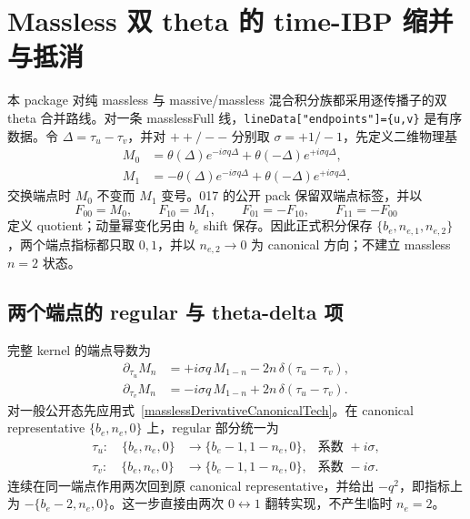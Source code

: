 ﻿\documentclass[a4paper,11pt]{article}
\begin{document}
\section{Massless 双 theta 的 time-IBP 缩并与抵消}

本 package 对纯 massless 与 massive/massless 混合积分族都采用逐传播子的双 theta 合并路线。对一条 masslessFull 线，\texttt{lineData["endpoints"]=\{u,v\}} 是有序数据。令 $\Delta=\tau_u-\tau_v$，并对 $++/--$ 分别取 $\sigma=+1/-1$，先定义二维物理基
\begin{align}
 M_0 &=
 \theta(\Delta)e^{-i\sigma q\Delta}
 +\theta(-\Delta)e^{+i\sigma q\Delta},\\
 M_1 &=
 -\theta(\Delta)e^{-i\sigma q\Delta}
 +\theta(-\Delta)e^{+i\sigma q\Delta}.
 \label{masslessM01Tech}
\end{align}
交换端点时 $M_0$ 不变而 $M_1$ 变号。017 的公开 pack 保留双端点标签，并以
\begin{equation}
 F_{00}=M_0,\qquad F_{10}=M_1,\qquad
 F_{01}=-F_{10},\qquad F_{11}=-F_{00}
 \label{masslessDerivativeCanonicalTech}
\end{equation}
定义 quotient；动量幂变化另由 $b_e$ shift 保存。因此正式积分保存 $\{b_e,n_{e,1},n_{e,2}\}$，两个端点指标都只取 $0,1$，并以 $n_{e,2}\to0$ 为 canonical 方向；不建立 massless $n=2$ 状态。

\subsection{两个端点的 regular 与 theta-delta 项}

完整 kernel 的端点导数为
\begin{align}
 \partial_{\tau_u}M_n
 &=+i\sigma q\,M_{1-n}
   -2n\,\delta(\tau_u-\tau_v),\\
 \partial_{\tau_v}M_n
 &=-i\sigma q\,M_{1-n}
   +2n\,\delta(\tau_u-\tau_v).
 \label{masslessTimeRulesTech}
\end{align}
对一般公开态先应用式~\eqref{masslessDerivativeCanonicalTech}。在 canonical representative $\{b_e,n_e,0\}$ 上，regular 部分统一为
\begin{align}
 \tau_u:\quad
 \{b_e,n_e,0\}&\longrightarrow\{b_e-1,1-n_e,0\},
 &\text{系数 }+i\sigma,\\
 \tau_v:\quad
 \{b_e,n_e,0\}&\longrightarrow\{b_e-1,1-n_e,0\},
 &\text{系数 }-i\sigma.
\end{align}
连续在同一端点作用两次回到原 canonical representative，并给出 $-q^2$，即指标上为 $-\{b_e-2,n_e,0\}$。这一步直接由两次 $0\leftrightarrow1$ 翻转实现，不产生临时 $n_e=2$。
\end{document}
